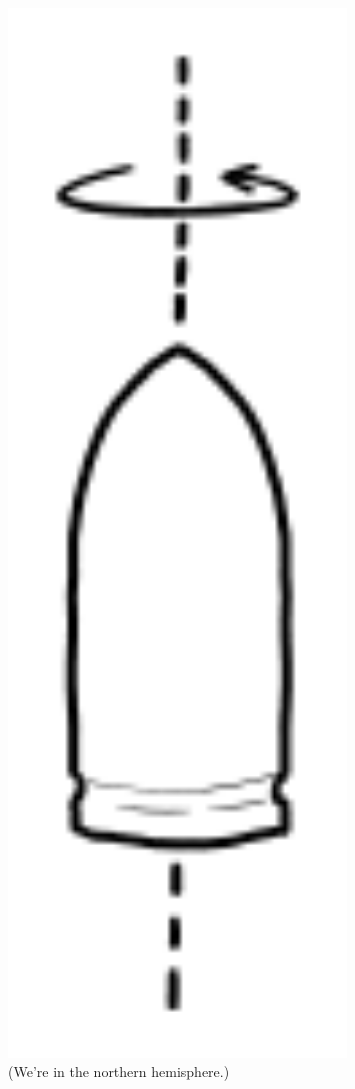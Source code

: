 {\begin{figure}[!htbp]
\centering
\includegraphics[scale=0.5, max width=0.8\textwidth]{imgs/a/81/catch_spin.png}
\caption{(We're in the northern hemisphere.)}
\end{figure}

}
